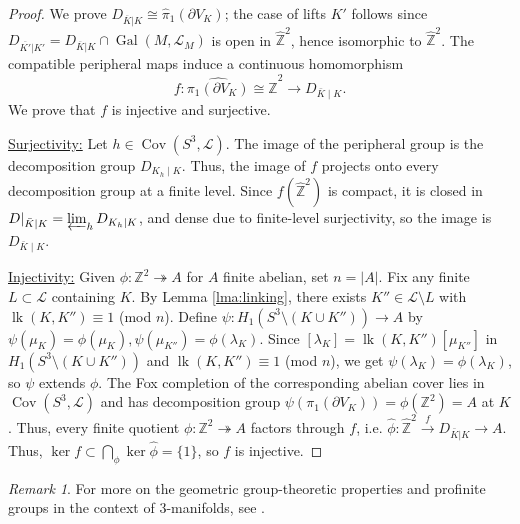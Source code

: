 \documentclass{amsart}
\theoremstyle{plain}
\theoremstyle{definition}
\theoremstyle{plain}
\theoremstyle{plain}
\theoremstyle{plain}
\theoremstyle{remark}
\newtheorem{remark}[theorem]{Remark}
\theoremstyle{remark}
\theoremstyle{plain}
\theoremstyle{definition}
\theoremstyle{plain}
\DeclareMathOperator{\Gal}{\mathrm{Gal}}
\DeclareMathOperator{\Cov}{\mathrm{Cov}}
\DeclareMathOperator{\lk}{\mathrm{lk}}
\theoremstyle{plain}
\theoremstyle{plain}
\numberwithin{equation}{section}
\begin{document}
\begin{proof}
We prove $D_{\overline{K}|K} \cong \widehat{\pi}_1(\partial V_{K})$; the case of lifts $K'$ follows since $D_{\overline{K'}|K'} = D_{\overline{K}|K} \cap \Gal(M, \mathcal{L}_M)$ is open in $\widehat{\mathbb{Z}}^2$, hence isomorphic to $\widehat{\mathbb{Z}}^2$. The compatible peripheral maps induce a continuous homomorphism
\begin{equation}
    f: \widehat{\pi_1(\partial V_K)} \cong \widehat{\mathbb Z}^2 \to D_{\bar K \mid K}.
\end{equation}
We prove that $f$ is injective and surjective.

\medskip

\underline{Surjectivity:} Let $h \in \Cov(S^3, \mathcal L)$. The image of the peripheral group is the decomposition group $D_{K_h \mid K}$. Thus, the image of $f$ projects onto every decomposition group at a finite level. Since $f(\widehat{\mathbb Z}^2)$ is compact, it is closed in $D|_{\bar K \mid K} = \varprojlim_hD_{K_h \mid K}$, and dense due to finite-level surjectivity, so the image is $D_{\bar K \mid K}$.

\medskip

\underline{Injectivity:} Given $\phi: \mathbb{Z}^2 \twoheadrightarrow A$ for $A$ finite abelian, set $n = |A|$. Fix any finite $L \subset \mathcal{L}$ containing $K$. By Lemma \ref{lma:linking}, there exists $K'' \in \mathcal{L} \setminus L$ with $\lk(K, K'') \equiv 1$ (mod $n$). Define $\psi: H_1(S^3 \setminus (K \cup K'')) \to A$ by $\psi(\mu_K) = \phi(\mu_K), \psi(\mu_{K''}) = \phi(\lambda_K)$. Since $[\lambda_K] = \lk(K, K'')[\mu_{K''}]$ in $H_1(S^3 \setminus (K \cup K''))$ and $\lk(K, K'') \equiv 1$ (mod $n$), we get $\psi(\lambda_K) = \phi(\lambda_K)$, so $\psi$ extends $\phi$. The Fox completion of the corresponding abelian cover lies in $\Cov(S^3, \mathcal{L})$ and has decomposition group $\psi(\pi_1(\partial V_K)) = \phi(\mathbb{Z}^2) = A$ at $K$. Thus, every finite quotient $\phi: \mathbb{Z}^2 \twoheadrightarrow A$ factors through $f$, i.e. $\widehat\phi: \widehat{\mathbb Z}^2 \xrightarrow{f} D_{\bar K|K} \to A$. Thus, $\ker f \subset \bigcap_\phi \ker\widehat{\phi} = \{1\}$, so $f$ is injective.
\end{proof}

\begin{remark}
For more on the geometric group-theoretic properties and profinite groups in the context of 3-manifolds, see \cite{3groups}.
\end{remark}
\end{document}
